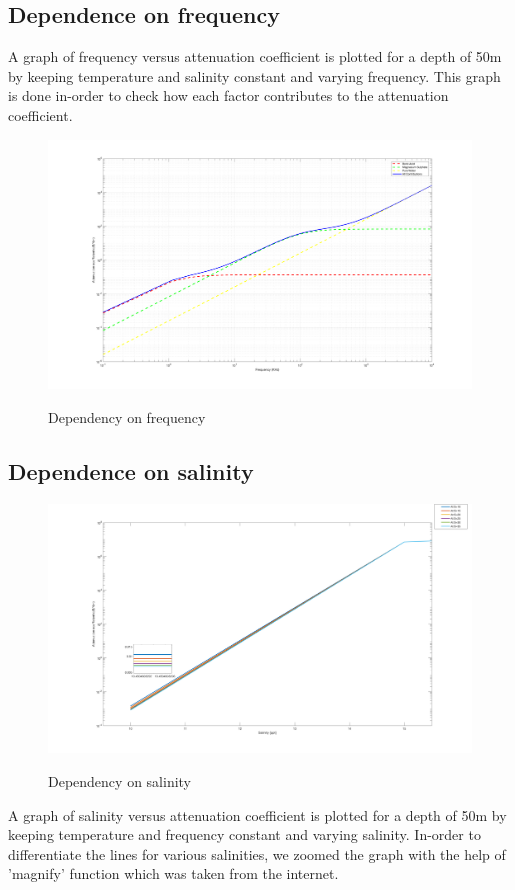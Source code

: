 \subsection{Dependence on frequency} \label{Dependence on frequency} 
\noindent A graph of frequency versus attenuation coefficient is plotted for a depth of 50m by keeping temperature and salinity constant and varying frequency. This graph is done in-order to check how each factor contributes to the attenuation coefficient.
\begin{figure}[H]
\centering
{\includegraphics[scale=0.15]{ucp2_2.png}}
\caption{Dependency on frequency}
\end{figure}

\subsection{Dependence on salinity} \label{Dependence on salinity} 

\begin{figure}[H]
\centering
{\includegraphics[scale=0.15]{ucp2_3.png}}
\caption{Dependency on salinity}
\end{figure}
\noindent A graph of salinity versus attenuation coefficient is plotted for a depth of 50m by keeping temperature and frequency constant and varying salinity. In-order to differentiate the lines for various salinities, we zoomed the graph with the help of 'magnify' function which was taken from the internet.

